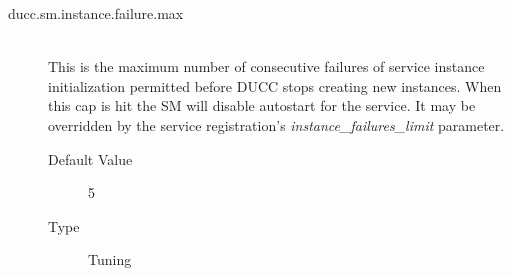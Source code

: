 \begin{description}
      \item[ducc.sm.instance.failure.max] \hfill \\
        This is the maximum number of consecutive failures of service instance initialization 
        permitted before DUCC stops creating new instances.  When this cap is hit the SM
        will disable autostart for the service.  It may be overridden by the service
        registration's {\em instance\_failures\_limit} parameter.
        \begin{description}
          \item[Default Value] 5
          \item[Type] Tuning 
        \end{description}
        
      \end{description}
      

